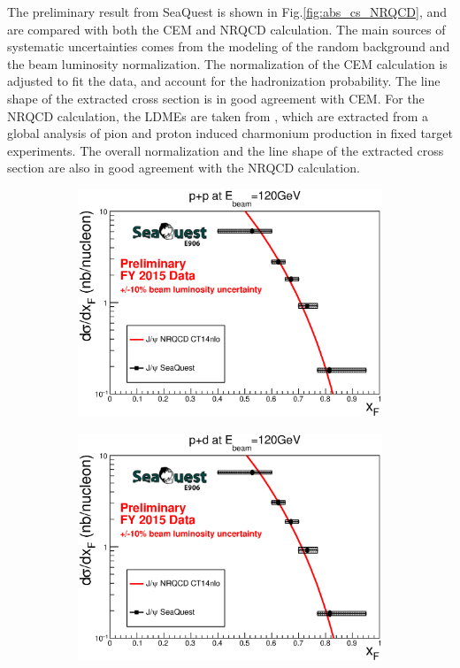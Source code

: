 \documentclass[10pt, a4paper,final]{article}
\begin{document}
The preliminary result from SeaQuest is shown in Fig.\ref{fig:abs_cs_NRQCD},
and are compared with both the CEM and NRQCD calculation. The main sources
of systematic uncertainties comes from the modeling of the random background
and the beam luminosity normalization. The normalization of the CEM calculation is
adjusted to fit the data, and account for the hadronization probability. The line
shape of the extracted cross section is in good agreement with CEM. For the NRQCD
calculation, the LDMEs are taken from \cite{hsieh2021}, which are extracted from
a global analysis of pion and proton induced charmonium production in fixed target
experiments. The overall normalization and the line shape of the extracted cross
section are also in good agreement with the NRQCD calculation.
\begin{figure}[htbp!]
	\centering
	\begin{subfigure}{0.45\linewidth}
		\includegraphics[width=0.9\linewidth]{jpsi_xF_LH2}
	\end{subfigure}
	\begin{subfigure}{0.45\linewidth}
		\includegraphics[width=0.9\linewidth]{jpsi_xF_LD2}

\end{subfigure}
\end{figure}
\end{document}

